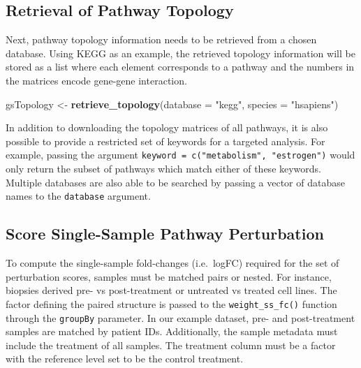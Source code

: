 \documentclass[9pt,a4paper,]{extarticle}
\newenvironment{Shaded}{\begin{snugshade}}{\end{snugshade}}
\newcommand{\AttributeTok}[1]{\textcolor[rgb]{0.13,0.29,0.53}{#1}}
\newcommand{\FunctionTok}[1]{\textcolor[rgb]{0.13,0.29,0.53}{\textbf{#1}}}
\newcommand{\NormalTok}[1]{#1}
\newcommand{\OtherTok}[1]{\textcolor[rgb]{0.56,0.35,0.01}{#1}}
\newcommand{\StringTok}[1]{\textcolor[rgb]{0.31,0.60,0.02}{#1}}
\begin{document}
\hypertarget{retrieval-of-pathway-topology}{%
\subsection{Retrieval of Pathway Topology}\label{retrieval-of-pathway-topology}}

Next, pathway topology information needs to be retrieved from a chosen database.
Using KEGG as an example, the retrieved topology information will be stored as a list where each element corresponds to a pathway and the numbers in the matrices encode gene-gene interaction.

\begin{Shaded}
\begin{Highlighting}[]
\NormalTok{gsTopology }\OtherTok{\textless{}{-}} \FunctionTok{retrieve\_topology}\NormalTok{(}\AttributeTok{database =} \StringTok{"kegg"}\NormalTok{, }\AttributeTok{species =} \StringTok{"hsapiens"}\NormalTok{)}
\end{Highlighting}
\end{Shaded}

In addition to downloading the topology matrices of all pathways, it is also possible to provide a restricted set of keywords for a targeted analysis.
For example, passing the argument \texttt{keyword\ =\ c("metabolism",\ "estrogen")} would only return the subset of pathways which match either of these keywords.
Multiple databases are also able to be searched by passing a vector of database names to the \texttt{database} argument.

\hypertarget{score-single-sample-pathway-perturbation}{%
\subsection{Score Single-Sample Pathway Perturbation}\label{score-single-sample-pathway-perturbation}}

To compute the single-sample fold-changes (i.e.~logFC) required for the set of perturbation scores, samples must be matched pairs or nested.
For instance, biopsies derived pre- vs post-treatment or untreated vs treated cell lines.
The factor defining the paired structure is passed to the \texttt{weight\_ss\_fc()} function through the \texttt{groupBy} parameter.
In our example dataset, pre- and post-treatment samples are matched by patient IDs.
Additionally, the sample metadata must include the treatment of all samples.
The treatment column must be a factor with the reference level set to be the control treatment.
\end{document}
